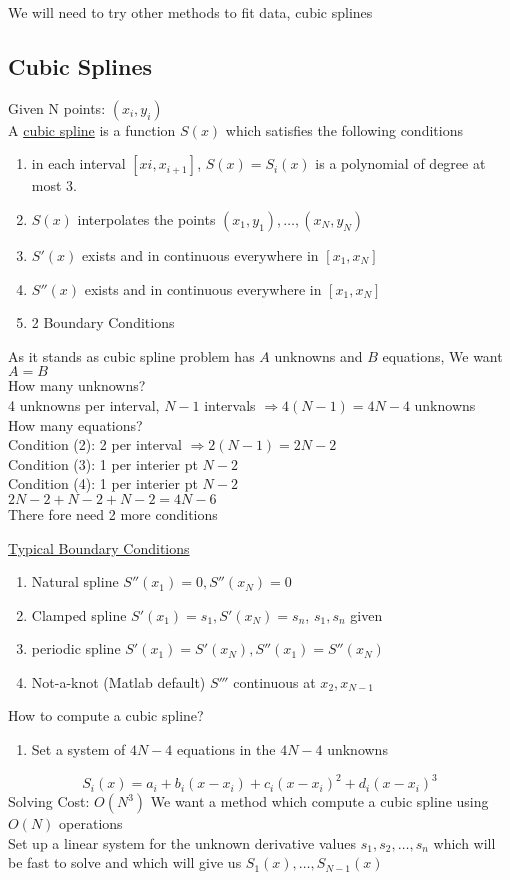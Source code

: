 \documentclass[10pt,usletter]{article}
\begin{document}
We will need to try other methods to fit data, cubic splines

\subsection{Cubic Splines}
Given N points: $(x_i, y_i)$\\
A \underline{cubic spline} is a function $S(x)$ which satisfies the following conditions
\begin{enumerate}
\item in each interval $[xi, x_{i+1}]$, $S(x)=S_i(x)$ is a polynomial of degree at most 3.
\item $S(x)$ interpolates the points $(x_1,y_1),\hdots,(x_N,y_N)$
\item $S'(x)$ exists and in continuous everywhere in $[x_1, x_N]$
\item $S''(x)$ exists and in continuous everywhere in $[x_1,x_N]$
\item 2 Boundary Conditions
\end{enumerate}
As it stands as cubic spline problem has $A$ unknowns and $B$ equations, We want $A=B$\\
How many unknowns?\\
4 unknowns per interval, $N-1$ intervals $\Rightarrow 4(N-1)=4N-4$ unknowns\\
How many equations?\\
Condition (2): 2 per interval $\Rightarrow 2(N-1)=2N-2$\\
Condition (3): 1 per interier pt $N-2$\\
Condition (4): 1 per interier pt $N-2$\\
$2N-2+N-2+N-2=4N-6$\\
There fore need 2 more conditions

\underline{Typical Boundary Conditions}
\begin{enumerate}
\item Natural spline $S''(x_1)=0, S''(x_N)=0$
\item Clamped spline $S'(x_1)=s_1, S'(x_N)=s_n$, $s_1,s_n$ given
\item periodic spline $S'(x_1)=S'(x_N), S''(x_1)=S''(x_N)$
\item Not-a-knot (Matlab default) $S'''$ continuous at $x_2, x_{N-1}$
\end{enumerate}
How to compute a cubic spline?
\begin{enumerate}
\item Set a system of $4N-4$ equations in the $4N-4$ unknowns
\end{enumerate}
$$S_i(x)=a_i+b_i(x-x_i)+c_i(x-x_i)^2+d_i(x-x_i)^3$$
Solving Cost: $O(N^3)$
We want a method which compute a cubic spline using $O(N)$ operations\\
Set up a linear system for the unknown derivative values $s_1,s_2,\hdots,s_n$ which will be fast to solve and which will give us $S_1(x),\hdots,S_{N-1}(x)$
\end{document}

